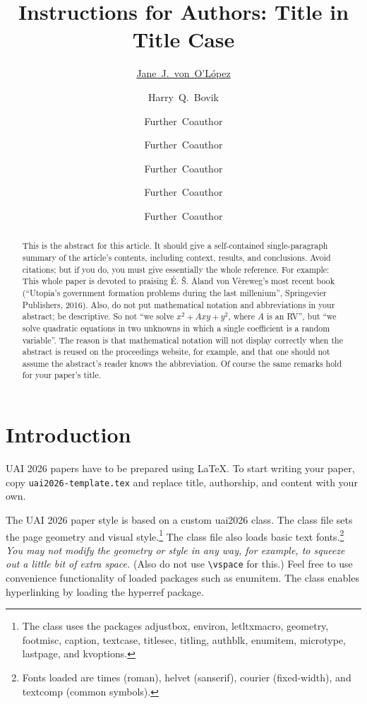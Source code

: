 \documentclass{uai2026} %
\title{Instructions for Authors: Title in Title Case}
\author[1]{\href{mailto:<jj@example.edu>?Subject=Your UAI 2026 paper}{Jane~J.~von~O'L\'opez}{}}
\author[1]{Harry~Q.~Bovik}
\author[1,2]{Further~Coauthor}
\author[3]{Further~Coauthor}
\author[1]{Further~Coauthor}
\author[3]{Further~Coauthor}
\author[3,1]{Further~Coauthor}
\affil[1]{%
    Computer Science Dept.\\
    Cranberry University\\
    Pittsburgh, Pennsylvania, USA
}
\affil[2]{%
    Second Affiliation\\
    Address\\
    …
}
\affil[3]{%
    Another Affiliation\\
    Address\\
    …
  }
\begin{document}
\maketitle

\begin{abstract}
  This is the abstract for this article.
  It should give a self-contained single-paragraph summary of the article's contents, including context, results, and conclusions.
  Avoid citations; but if you do, you must give essentially the whole reference.
  For example: This whole paper is devoted to praising É. Š. Åland von Vèreweg's most recent book (“Utopia's government formation problems during the last millenium”, Springevier Publishers, 2016).
  Also, do not put mathematical notation and abbreviations in your abstract; be descriptive.
  So not “we solve \(x^2+A xy+y^2\), where \(A\) is an RV”, but “we solve quadratic equations in two unknowns in which a single coefficient is a random variable”.
  The reason is that mathematical notation will not display correctly when the abstract is reused on the proceedings website, for example, and that one should not assume the abstract's reader knows the abbreviation.
  Of course the same remarks hold for your paper's title.
\end{abstract}

\section{Introduction}\label{sec:intro}
UAI 2026 papers have to be prepared using \LaTeX.
To start writing your paper, copy \texttt{uai2026-template.tex} and replace title, authorship, and content with your own.

The UAI 2026 paper style is based on a custom \textsf{uai2026} class.
The class file sets the page geometry and visual style.\footnote{%
    The class uses the packages \textsf{adjustbox}, \textsf{environ}, \textsf{letltxmacro}, \textsf{geometry}, \textsf{footmisc}, \textsf{caption}, \textsf{textcase}, \textsf{titlesec}, \textsf{titling}, \textsf{authblk}, \textsf{enumitem}, \textsf{microtype}, \textsf{lastpage}, and \textsf{kvoptions}.
}
The class file also loads basic text fonts.\footnote{%
    Fonts loaded are \textsf{times} (roman), \textsf{helvet} (sanserif), \textsf{courier} (fixed-width), and \textsf{textcomp} (common symbols).
}
\emph{You may not modify the geometry or style in any way, for example, to squeeze out a little bit of extra space.}
(Also do not use \verb|\vspace| for this.)
Feel free to use convenience functionality of loaded packages such as \textsf{enumitem}.
The class enables hyperlinking by loading the \textsf{hyperref} package.
\end{document}
